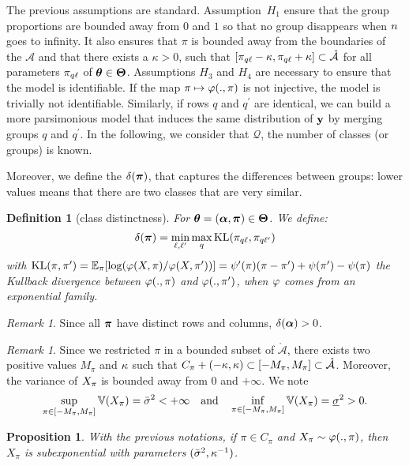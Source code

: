 \documentclass[]{imsart}
\newcommand{\1}{\mathds{1}}
\numberwithin{equation}{section}
\theoremstyle{plain}
\newtheorem{dof}[thm]{Definition}
\newtheorem{proposition}[thm]{Proposition}
\theoremstyle{remark}
\newtheorem{rem}[thm]{Remark}
\begin{document}
The previous assumptions are standard. Assumption~$H_1$ ensure that the group proportions are bounded away from $0$ and $1$ so that no group disappears when $n$ goes to infinity. It also ensures that $\pi$ is bounded away from the boundaries of the $\mathcal{A}$ and that there exists a $\kappa>0$, such that $[\pi_{q \ell} - \kappa, \pi_{q \ell} + \kappa] \subset \mathring{\mathcal{A}}$ for all parameters $\pi_{q \ell}$ of $\boldsymbol{\theta} \in \boldsymbol{\Theta}$. Assumptions $H_3$ and $H_4$ are necessary to ensure that the model is identifiable. If the map $\pi \mapsto \varphi(., \pi)$ is not injective, the model is trivially not identifiable. Similarly, if rows $q$ and $q^\prime$ are identical, we can build a more parsimonious model that induces the same distribution of $\mathbf{y}$ by merging groups $q$ and $q^\prime$. In the following, we  consider that $\mathcal{Q}$, the number of classes (or groups) is known.

Moreover, we define the $ \delta(\boldsymbol{\pi})$, that captures the differences between groups: lower values means that there are two classes that are very similar. 
\begin{dof}[class distinctness]
  \label{def:group-distinctness}
  For $\boldsymbol{\theta} = (\boldsymbol{\alpha}, \boldsymbol{\pi}) \in \boldsymbol{\Theta}$. We define:
  \begin{equation*}
    \delta(\bal) =  \min_{\el, \lp} \max_{q} \KL(\piql, \pi_{q \lp}) 
  \end{equation*}
  with $\operatorname{KL}(\pi,\pi') = \mathbb{E}_{\pi}[\log(\varphi(X, \pi)/\varphi(X, \pi'))]=\psi'(\pi) (\pi - \pi') + \psi(\pi') - \psi(\pi)$ the Kullback divergence between $\varphi(., \pi)$ and $\varphi(., \pi')$, when $\varphi$ comes from an exponential family.
\end{dof}
\begin{rem}
Since all $\boldsymbol{\pi}$ have distinct rows and columns, $\delta(\boldsymbol{\alpha}) > 0$.
\end{rem}

\begin{rem}
Since we restricted $\pi$ in a bounded subset of $\mathring{\mathcal{A}}$, there exists two positive values $M_{\pi}$ and $\kappa$ such that $C_\pi + (-\kappa, \kappa) \subset [-M_{\pi}, M_\pi] \subset \mathring{\mathcal{A}}$. Moreover, the variance of $X_{\pi}$ is bounded away from $0$ and $+\infty$. We note
\begin{equation}
  \label{eq:condition-variance}
  \sup_{\pi \in [-M_{\pi}, M_{\pi}] } \Var(\X_\pi) = \vmax^2 < +\infty \quad \text{and} \quad \inf_{\pi \in [-M_{\pi}, M_{\pi}]} \Var(\X_\pi) = \vmin^2 > 0.
\end{equation}
\end{rem}
\begin{proposition}
With the previous notations, if $\pi \in C_\pi$ and $X_{\pi} \sim \varphi(., \pi)$, then $X_\pi$ is subexponential with parameters $(\bar{\sigma}^2, \kappa^{-1})$.
\end{proposition}
\end{document}
